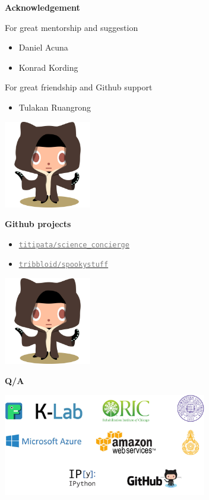 \begin{frame}{\textbf{Acknowledgement}}

For great mentorship and suggestion
\begin{itemize}
\item Daniel Acuna
\item Konrad Kording
\end{itemize}

For great friendship and Github support
\begin{itemize}
\item Tulakan Ruangrong
\end{itemize}

\begin{center}
\includegraphics[width=1.5in]{images/octobiwan}
\end{center}

\end{frame}


\begin{frame}{\textbf{Github projects}}

\begin{itemize}
\item \href{https://github.com/titipata/science\_concierge}{\textcolor{gray}{\texttt{titipata/science\_concierge}}}
\item \href{https://github.com/tribbloid/spookystuff}{\textcolor{gray}{\texttt{tribbloid/spookystuff}}}
\end{itemize}

\begin{center}
\includegraphics[width=1.5in]{images/octobiwan}
\end{center}

\end{frame}


\begin{frame}

\begin{center}
\textbf{Q/A}
\end{center}

\begin{center}
\includegraphics[width=3.5in]{images/cover_back}
\end{center}

\end{frame}

